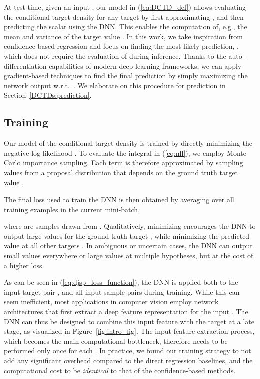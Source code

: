 \documentclass[runningheads]{llncs}
\begin{document}
At test time, given an input , our model in (\ref{eq:DCTD_def}) allows evaluating the conditional target density  for any target  by first approximating , and then predicting the scalar  using the DNN. This enables the computation of, e.g., the mean and variance of the target value . In this work, we take inspiration from confidence-based regression and focus on finding the most likely prediction, , which does not require the evaluation of  during inference. Thanks to the auto-differentiation capabilities of modern deep learning frameworks, we can apply gradient-based techniques to find the final prediction by simply maximizing the network output  w.r.t.\ . We elaborate on this procedure for prediction in Section~\ref{DCTDs:prediction}.




\subsection{Training}
\label{DCTDs:training}

Our model  of the conditional target density is trained by directly minimizing the negative log-likelihood . To evaluate the integral in (\ref{eq:nll}), we employ Monte Carlo importance sampling. Each term  is therefore approximated by sampling values  from a proposal distribution  that depends on the ground truth target value , 

The final loss  used to train the DNN  is then obtained by averaging over all training examples  in the current mini-batch,

where  are  samples drawn from . Qualitatively, minimizing  encourages the DNN to output large values  for the ground truth target , while minimizing the predicted value  at all other targets . In ambiguous or uncertain cases, the DNN can output small values everywhere or large values at multiple hypotheses, but at the cost of a higher loss.

As can be seen in (\ref{eq:djsp_loss_function}), the DNN  is applied both to the input-target pair , and all input-sample pairs  during training. While this can seem inefficient, most applications in computer vision employ network architectures that first extract a deep feature representation for the input . The DNN  can thus be designed to combine this input feature with the target  at a late stage, as visualized in Figure~\ref{fig:intro_fig}. The input feature extraction process, which becomes the main computational bottleneck, therefore needs to be performed only once for each . In practice, we found our training strategy to not add any significant overhead compared to the direct regression baselines, and the computational cost to be \emph{identical} to that of the confidence-based methods.
\end{document}
